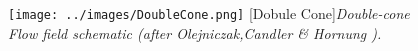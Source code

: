 \begin{figure}[H]
\centering
\texttt{[image: ../images/DoubleCone.png]}
[Dobule Cone]{\textit{Double-cone Flow field schematic (after Olejniczak,Candler \& Hornung \citep{olejniczak1997}).}}
\label{fig:olej}
\end{figure}
